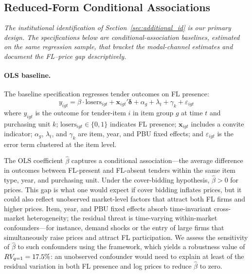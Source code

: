 
\subsection{Reduced-Form Conditional Associations}
\label{sec:reduced_form}

\noindent\textit{The institutional identification of
Section~\ref{sec:additional_id} is our primary design. The
specifications below are conditional-association baselines,
estimated on the same regression sample, that bracket the
modal-channel estimates and document the FL--price gap
descriptively.}\medskip

\paragraph{OLS baseline.}
The baseline specification regresses tender outcomes on FL presence:
\begin{equation}
  y_{igt} = \beta \cdot \text{losers}_{igt} + \mathbf{x}_{igt}'
  \boldsymbol{\delta} + \alpha_g + \lambda_t + \gamma_k + \varepsilon_{igt}
  \label{eq:ols_main}
\end{equation}
where $y_{igt}$ is the outcome for tender-item $i$ in item group $g$ at
time $t$ and purchasing unit $k$; $\text{losers}_{igt} \in \{0,1\}$
indicates FL presence; $\mathbf{x}_{igt}$ includes a convite indicator;
$\alpha_g$, $\lambda_t$, and $\gamma_k$ are item, year, and PBU fixed
effects; and $\varepsilon_{igt}$ is the error term clustered at the item
level.

The OLS coefficient $\hat{\beta}$ captures a conditional
association---the average difference in outcomes between FL-present and
FL-absent tenders within the same item type, year, and purchasing unit.
Under the cover-bidding hypothesis, $\hat{\beta} > 0$ for prices.
This gap is what one would expect if cover bidding inflates prices, but
it could also reflect unobserved market-level factors that attract both
FL firms and higher prices. Item, year, and PBU fixed effects absorb
time-invariant cross-market heterogeneity; the residual threat is time-varying within-market confounders---for
instance, demand shocks or the entry of large firms that
simultaneously raise prices and attract FL participation. We assess the sensitivity of
$\hat{\beta}$ to such confounders using the \citet{cinelli2020making}
framework, which yields a robustness value of $RV_{q=1} = 17.5\%$: an
unobserved confounder would need to explain at least \valRVqOne of the
residual variation in both FL presence and log prices to reduce
$\hat{\beta}$ to zero.

